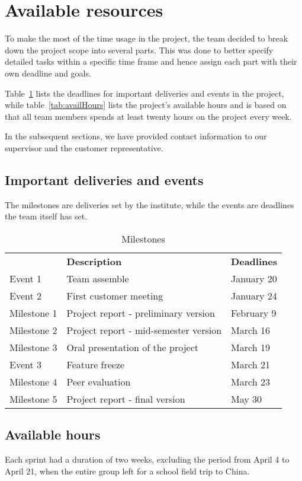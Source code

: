 \newpage
\section{Available resources}
To make the most of the time usage in the project, the team decided to break down the project scope into several parts. This was done to better specify detailed tasks within a specific time frame and hence assign each part with their own deadline and goals.

Table~\ref{tab:milestones} lists the deadlines for important deliveries and events in the project, while table~\ref{tab:availHours} lists the project's available hours and is based on that all team members spends at least twenty hours on the project every week. 

In the subsequent sections, we have provided contact information to our supervisor and the customer representative.

\subsection{Important deliveries and events}
The milestones are deliveries set by the institute, while the events are deadlines the team itself has set.

\begin{table}[H]
\centering
{}
\begin{tabular}{|l|l|l|}
\hline
\textbf{} & \textbf{Description} & \textbf{Deadlines}\\
Event 1 & Team assemble & January 20\\
Event 2 & First customer meeting & January 24\\
Milestone 1& Project report - preliminary version & February 9 \\
Milestone 2 & Project report - mid-semester version & March 16  \\
Milestone 3 & Oral presentation of the project & March 19\\
Event 3 & Feature freeze & March 21\\
Milestone 4 & Peer evaluation & March 23  \\
Milestone 5 & Project report - final version & May 30\\\hline
\end{tabular}
\caption{Milestones}
\label{tab:milestones}
\end{table}

\subsection{Available hours}
Each sprint had a duration of two weeks, excluding the period from April 4 to April 21, when the entire group left for a school field trip to China.

